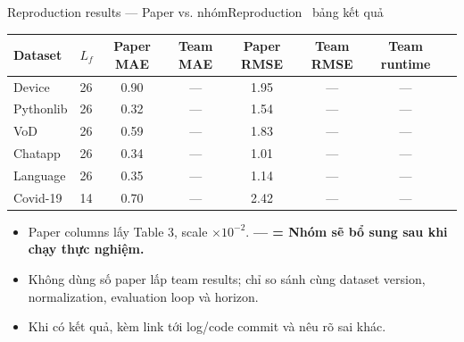 \documentclass[aspectratio=169,11pt]{beamer}
\begin{document}
\begin{frame}[shrink=19]{Reproduction results --- Paper vs. nhóm}{Reproduction \textperiodcentered\ bảng kết quả}
\centering
{\small
\begin{tabular}{@{}llcccccc@{}}
  \toprule
  Dataset & $L_f$ & Paper MAE & Team MAE & Paper RMSE & Team RMSE & Team runtime\\
  \midrule
  Device & 26 & 0.90 & --- & 1.95 & --- & ---\\
  Pythonlib & 26 & 0.32 & --- & 1.54 & --- & ---\\
  VoD & 26 & 0.59 & --- & 1.83 & --- & ---\\
  Chatapp & 26 & 0.34 & --- & 1.01 & --- & ---\\
  Language & 26 & 0.35 & --- & 1.14 & --- & ---\\
  Covid-19 & 14 & 0.70 & --- & 2.42 & --- & ---\\
  \bottomrule
\end{tabular}}
\vspace{5mm}
\begin{itemize}
  \item Paper columns lấy Table 3, scale $\times10^{-2}$. \textbf{--- = Nhóm sẽ bổ sung sau khi chạy thực nghiệm.}
  \item Không dùng số paper lấp team results; chỉ so sánh cùng dataset version, normalization, evaluation loop và horizon.
  \item Khi có kết quả, kèm link tới log/code commit và nêu rõ sai khác.
\end{itemize}
\vspace{3mm}
\end{frame}
\end{document}
